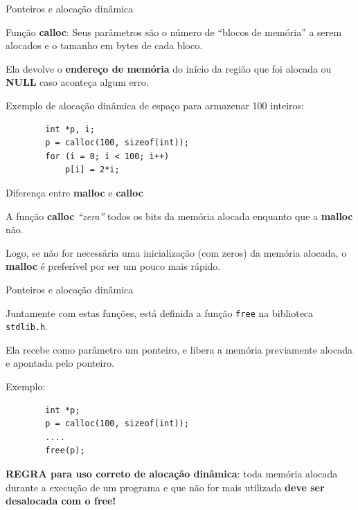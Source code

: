 \documentclass[handout]{beamer}
\newcommand{\cod}[1]{\texttt{#1}}
\begin{document}
\begin{frame}[fragile]{Ponteiros e alocação dinâmica}

    Função {\bf calloc}: Seus parâmetros são o número de ``blocos de memória'' a serem alocados e o tamanho \alert{em bytes} de cada bloco. 

    Ela devolve o {\bf endereço de memória} do início da região que foi alocada ou {\bf NULL} caso aconteça algum erro.

    \pause

    Exemplo de alocação dinâmica de espaço para armazenar 100 inteiros:
    \begin{verbatim}
        int *p, i;
        p = calloc(100, sizeof(int));
        for (i = 0; i < 100; i++)
            p[i] = 2*i;
    \end{verbatim}

\end{frame}

\begin{frame}[fragile]{Diferença entre {\bf malloc} e {\bf calloc}}

    A função {\bf calloc} {\it ``zera''} todos os bits da memória alocada enquanto que a {\bf malloc} não.
    
    Logo, se não for necessária uma inicialização (com zeros) da memória alocada, o {\bf malloc} é preferível por ser um pouco mais rápido.

\end{frame}

\begin{frame}[fragile]{Ponteiros e alocação dinâmica}

    Juntamente com estas funções, está definida a função \cod{free} na biblioteca \texttt{stdlib.h}.

    Ela recebe como parâmetro um ponteiro, e libera a memória previamente alocada e apontada pelo ponteiro.

    Exemplo:
    \begin{verbatim}
        int *p;
        p = calloc(100, sizeof(int));
        ....
        free(p);
    \end{verbatim}

    {\bf REGRA para uso correto de alocação dinâmica}: toda memória alocada durante a execução de um programa e que não for mais utilizada \textbf{deve ser desalocada com o free!}

\end{frame}
\end{document}
